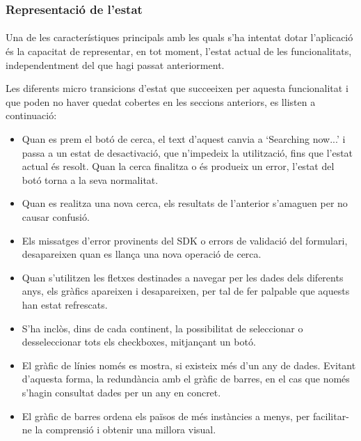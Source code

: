 \subsubsection{Representació de l'estat}

\paragraph{}
Una de les característiques principals amb les quals s'ha intentat dotar l'aplicació és la capacitat de representar, en tot moment, l'estat actual de les funcionalitats, independentment del que hagi passat anteriorment.

Les diferents micro transicions d'estat que succeeixen per aquesta funcionalitat i que poden no haver quedat cobertes en les seccions anteriors, es llisten a continuació:

\begin{itemize}
    \item Quan es prem el botó de cerca, el text d'aquest canvia a `Searching now...' i passa a un estat de desactivació, que n'impedeix la utilització, fins que l'estat actual és resolt. Quan la cerca finalitza o és produeix un error, l'estat del botó torna a la seva normalitat.
    \item Quan es realitza una nova cerca, els resultats de l'anterior s'amaguen per no causar confusió.
    \item Els missatges d'error provinents del SDK o errors de validació del formulari, desapareixen quan es llança una nova operació de cerca.
    \item Quan s'utilitzen les fletxes destinades a navegar per les dades dels diferents anys, els gràfics apareixen i desapareixen, per tal de fer palpable que aquests han estat refrescats.
    \item S'ha inclòs, dins de cada continent, la possibilitat de seleccionar o desseleccionar tots els checkboxes, mitjançant un botó.
    \item El gràfic de línies només es mostra, si existeix més d'un any de dades. Evitant d’aquesta forma, la redundància amb el gràfic de barres, en el cas que només s’hagin consultat dades per un any en concret.
    \item El gràfic de barres ordena els països de més instàncies a menys, per facilitar-ne la comprensió i obtenir una millora visual.
\end{itemize}

